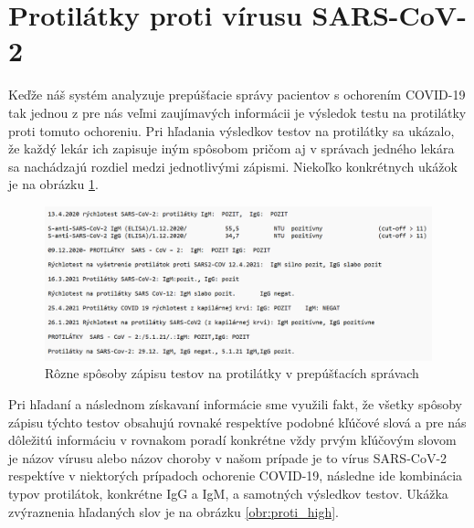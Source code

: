\section{Protilátky proti vírusu SARS-CoV-2}
\label{protilatky}

Keďže náš systém analyzuje prepúšťacie správy pacientov s ochorením COVID-19 tak jednou z pre nás veľmi zaujímavých informácii je výsledok testu na protilátky proti tomuto ochoreniu. Pri hľadania výsledkov testov na protilátky sa ukázalo, že každý lekár ich zapisuje iným spôsobom pričom aj v správach jedného lekára sa nachádzajú rozdiel medzi jednotlivými zápismi. Niekoľko konkrétnych ukážok je na obrázku \ref{obr:proti}. 

\begin{figure}
	\centerline{\includegraphics[width=1\textwidth]{images/protilatky}}
	\caption[Protilátky]{Rôzne spôsoby zápisu testov na protilátky v prepúšťacích správach}
	\label{obr:proti}
\end{figure}

Pri hľadaní a následnom získavaní informácie sme využili fakt, že všetky spôsoby zápisu týchto testov obsahujú rovnaké respektíve podobné kľúčové slová a pre nás dôležitú informáciu v rovnakom poradí konkrétne vždy prvým kľúčovým slovom je názov vírusu alebo názov choroby v našom prípade je to vírus SARS-CoV-2 respektíve v niektorých prípadoch ochorenie COVID-19, následne ide kombinácia typov protilátok, konkrétne IgG a IgM, a samotných výsledkov testov. Ukážka zvýraznenia hľadaných slov je na obrázku \ref{obr:proti_high}.

